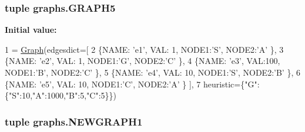 \subsubsection[{G\+R\+A\+P\+H5}]{\setlength{\rightskip}{0pt plus 5cm}tuple graphs.\+G\+R\+A\+P\+H5}\label{namespacegraphs_af8cb560a89de7afc3b01d32223a5b80f}
{\bfseries Initial value\+:}
\begin{DoxyCode}
1 = \hyperlink{classsearch_1_1_graph}{Graph}(edgesdict=[
2         \{NAME: \textcolor{stringliteral}{'e1'}, VAL:  1, NODE1:\textcolor{stringliteral}{'S'}, NODE2:\textcolor{stringliteral}{'A'} \},
3         \{NAME: \textcolor{stringliteral}{'e2'}, VAL:  1, NODE1:\textcolor{stringliteral}{'G'}, NODE2:\textcolor{stringliteral}{'C'} \},
4         \{NAME: \textcolor{stringliteral}{'e3'}, VAL:100, NODE1:\textcolor{stringliteral}{'B'}, NODE2:\textcolor{stringliteral}{'C'} \},
5         \{NAME: \textcolor{stringliteral}{'e4'}, VAL: 10, NODE1:\textcolor{stringliteral}{'S'}, NODE2:\textcolor{stringliteral}{'B'} \},
6         \{NAME: \textcolor{stringliteral}{'e5'}, VAL: 10, NODE1:\textcolor{stringliteral}{'C'}, NODE2:\textcolor{stringliteral}{'A'} \} ],
7                heuristic=\{\textcolor{stringliteral}{"G"}:\{\textcolor{stringliteral}{"S"}:10,\textcolor{stringliteral}{"A"}:1000,\textcolor{stringliteral}{"B"}:5,\textcolor{stringliteral}{"C"}:5\}\})
\end{DoxyCode}
\hypertarget{namespacegraphs_ae7c695b2068bab8045d93538cfc6b9f6}{}
\subsubsection[{N\+E\+W\+G\+R\+A\+P\+H1}]{\setlength{\rightskip}{0pt plus 5cm}tuple graphs.\+N\+E\+W\+G\+R\+A\+P\+H1}\label{namespacegraphs_ae7c695b2068bab8045d93538cfc6b9f6}
\hypertarget{namespacegraphs_aa9d133c69e3c2a88607b5ce7a3b43754}{}
